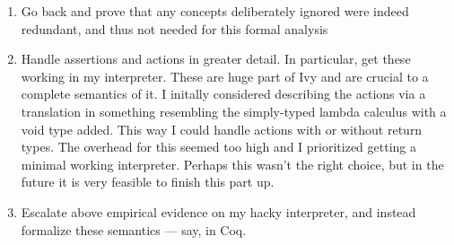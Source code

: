 \documentclass{article}
\begin{document}
\begin{multicols}{2}
    \begin{enumerate}
        \item Go back and prove that any concepts deliberately ignored were indeed redundant, and thus not needed for this formal analysis
        \item Handle assertions and actions in greater detail. In particular, get these working in my interpreter. These are huge part of Ivy and are crucial to a complete semantics of it. I initally considered describing the actions via a translation in something resembling the simply-typed lambda calculus with a void type added. This way I could handle actions with or without return types. The overhead for this seemed too high and I prioritized getting a minimal working interpreter. Perhaps this wasn't the right choice, but in the future it is very feasible to finish this part up.
        \item Escalate above empirical evidence on my hacky interpreter, and instead formalize these semantics --- say, in Coq.
    \end{enumerate}

\end{multicols}
\end{document}

